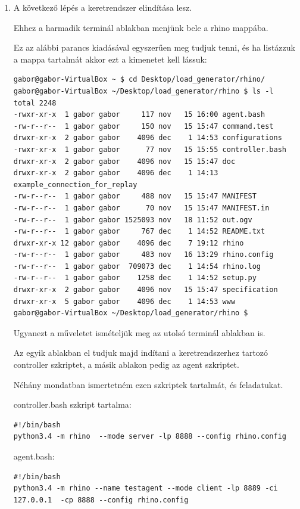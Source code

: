 \documentclass[a4paper,12pt,oneside]{report}
\begin{document}
\begin{enumerate}
\item A következő lépés a keretrendszer elindítása lesz.

Ehhez a harmadik terminál ablakban menjünk bele a rhino mappába.

Ez az alábbi parancs kiadásával egyszerűen meg tudjuk tenni, és ha listázzuk a mappa tartalmát akkor ezt a kimenetet kell lássuk:

\begin{lstlisting}
gabor@gabor-VirtualBox ~ $ cd Desktop/load_generator/rhino/
gabor@gabor-VirtualBox ~/Desktop/load_generator/rhino $ ls -l
total 2248
-rwxr-xr-x  1 gabor gabor     117 nov   15 16:00 agent.bash
-rw-r--r--  1 gabor gabor     150 nov   15 15:47 command.test
drwxr-xr-x  2 gabor gabor    4096 dec    1 14:53 configurations
-rwxr-xr-x  1 gabor gabor      77 nov   15 15:55 controller.bash
drwxr-xr-x  2 gabor gabor    4096 nov   15 15:47 doc
drwxr-xr-x  2 gabor gabor    4096 dec    1 14:13 example_connection_for_replay
-rw-r--r--  1 gabor gabor     488 nov   15 15:47 MANIFEST
-rw-r--r--  1 gabor gabor      70 nov   15 15:47 MANIFEST.in
-rw-r--r--  1 gabor gabor 1525093 nov   18 11:52 out.ogv
-rw-r--r--  1 gabor gabor     767 dec    1 14:52 README.txt
drwxr-xr-x 12 gabor gabor    4096 dec    7 19:12 rhino
-rw-r--r--  1 gabor gabor     483 nov   16 13:29 rhino.config
-rw-r--r--  1 gabor gabor  709073 dec    1 14:54 rhino.log
-rw-r--r--  1 gabor gabor    1258 dec    1 14:52 setup.py
drwxr-xr-x  2 gabor gabor    4096 nov   15 15:47 specification
drwxr-xr-x  5 gabor gabor    4096 dec    1 14:53 www
gabor@gabor-VirtualBox ~/Desktop/load_generator/rhino $

\end{lstlisting}

Ugyanezt a műveletet ismételjük meg az utolsó terminál ablakban is.

Az egyik ablakban el tudjuk majd indítani a keretrendszerhez tartozó controller szkriptet, a másik ablakon pedig az agent szkriptet.

Néhány mondatban ismertetném ezen szkriptek tartalmát, és feladatukat.

controller.bash szkript tartalma:
\begin{lstlisting}
#!/bin/bash
python3.4 -m rhino  --mode server -lp 8888 --config rhino.config
\end{lstlisting}

agent.bash:
\begin{lstlisting}
#!/bin/bash
python3.4 -m rhino --name testagent --mode client -lp 8889 -ci 127.0.0.1  -cp 8888 --config rhino.config
\end{lstlisting}


\end{enumerate}
\end{document}
